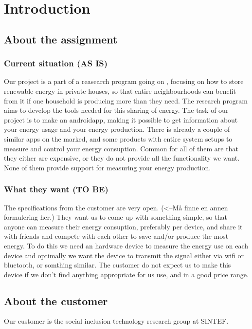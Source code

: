 \chapter{Introduction}

\section{About the assignment}
\subsection{Current situation (AS IS)}
Our project is a part of a reasearch program going on \cite{cossmic}, focusing on how to store renewable energy in private houses, so that entire neighbourhoods can benefit from it if one household is producing more than they need. The research program aims to develop the tools needed for this sharing of energy. The task of our project is to make an androidapp, making it possible to get information about your energy usage and your energy production. There is already a couple of similar apps on the marked, and some products with entire system setups to measure and control your energy consuption. Common for all of them are that they either are expensive, or they do not provide all the functionality we want. None of them provide support for measuring your energy production.  

\subsection{What they want (TO BE)}
The specifications from the customer are very open. (<--Må finne en annen formulering her.) They want us to come up with something simple, so that anyone can measure their energy consuption, preferably per device, and share it with friends and compete with each other to save and/or produce the most energy. To do this we need an hardware device to measure the energy use on each device and optimally we want the device to transmit the signal either via wifi or bluetooth, or somthing similar. The customer do not expect us to make this device if we don’t find anything appropriate for us use, and in a good price range.

\section{About the customer}

Our customer is the social inclusion technology research group at SINTEF. \cite{sintef}








 


